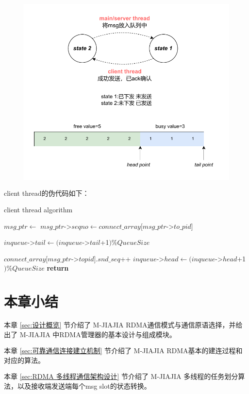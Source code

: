{    \begin{figure}[H]
        \centering
        \includegraphics[width=1.0\textwidth]{Img/send_state.drawio.pdf}
    \end{figure}

    client thread的伪代码如下：
    \begin{algorithm}
        \caption{client thread algorithm}
        \begin{algorithmic}[1] %
            \State {}
            \State $msg\_ptr \gets$ 
            \State $msg\_ptr$->$seqno \gets connect\_array[msg\_ptr$->$to\_pid]$

            \State
            \State {}
            \State {}
            \State {}
            \State $inqueue$->$tail \gets (inqueue$->$tail$+1$) \%QueueSize$
            \Else
            \EndWhile
            \EndIf

            \State
            \State $connect\_array[msg\_ptr$->$topid].snd\_seq$++
            \State $inqueue$->$head \gets (inqueue$->$head$+1$) \% QueueSize$
            \State {}
            \EndWhile
            \State \textbf{return}
            \EndProcedure
        \end{algorithmic}
    \end{algorithm}

    \section{本章小结}
    本章 \ref{sec:设计概览} 节介绍了 M-JIAJIA RDMA通信模式与通信原语选择，并给出了 M-JIAJIA 中RDMA管理器的基本设计与组成模块。

    本章 \ref{sec:可靠通信连接建立机制} 节介绍了 M-JIAJIA RDMA基本的建连过程和对应的算法。

    本章 \ref{sec:RDMA 多线程通信架构设计} 节介绍了 M-JIAJIA 多线程的任务划分算法，以及接收端发送端每个msg slot的状态转换。
}